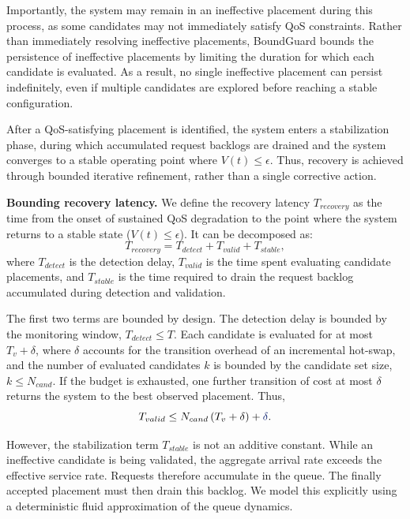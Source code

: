 \documentclass[conference]{IEEEtran}
\begin{document}
Importantly, the system may remain in an ineffective placement during this process, as some candidates may not immediately satisfy QoS constraints. 
Rather than immediately resolving ineffective placements, BoundGuard bounds the persistence of ineffective placements by limiting the duration for which each candidate is evaluated. 
As a result, no single ineffective placement can persist indefinitely, even if multiple candidates are explored before reaching a stable configuration.

After a QoS-satisfying placement is identified, the system enters a stabilization phase, during which accumulated request backlogs are drained and the system converges to a stable operating point where $V(t) \le \epsilon$. 
Thus, recovery is achieved through bounded iterative refinement, rather than a single corrective action.

\noindent\textbf{Bounding recovery latency.}
We define the recovery latency $T_{recovery}$ as the time from the onset of sustained QoS degradation to the point where the system returns to a stable state ($V(t) \le \epsilon$). It can be decomposed as:
\begin{equation}
T_{recovery} = T_{detect} + T_{valid} + T_{stable},
\label{eq:recovery_decomposition}
\end{equation}
where $T_{detect}$ is the detection delay, $T_{valid}$ is the time spent evaluating candidate placements, and $T_{stable}$ is the time required to drain the request backlog accumulated during detection and validation.

The first two terms are bounded by design. The detection delay is bounded by the monitoring window, $T_{detect} \le T$. Each candidate is evaluated for at most $T_v + \delta$, where $\delta$ accounts for the transition overhead of an incremental hot-swap, and the number of evaluated candidates $k$ is bounded by the candidate set size, $k \le N_{cand}$. \textcolor{navyblue}{If the budget is exhausted, one further transition of cost at most $\delta$ returns the system to the best observed placement.} Thus,
\begin{equation}
T_{valid} \le N_{cand}\,(T_v + \delta) + \textcolor{navyblue}{\delta}.
\label{eq:tvalid_bound}
\end{equation}

However, the stabilization term $T_{stable}$ is not an additive constant. While an ineffective candidate is being validated, the aggregate arrival rate exceeds the effective service rate. Requests therefore accumulate in the queue. The finally accepted placement must then drain this backlog. We model this explicitly using a deterministic fluid approximation of the queue dynamics.
\end{document}
